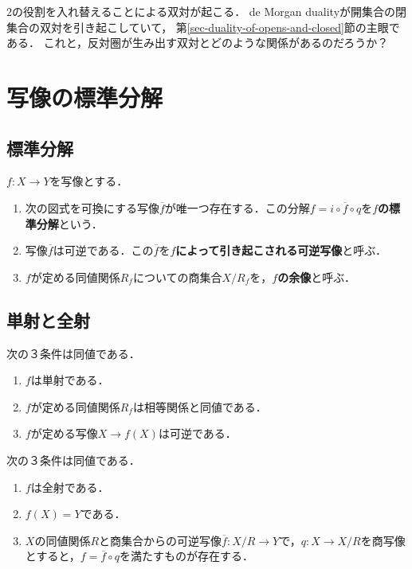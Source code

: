 \documentclass[uplatex,dvipdfmx]{jsreport}
\begin{document}
$2$の役割を入れ替えることによる双対が起こる．
de Morgan dualityが開集合の閉集合の双対を引き起こしていて，
第\ref{sec-duality-of-opens-and-closed}節の主眼である．
これと，反対圏が生み出す双対とどのような関係があるのだろうか？

\section{写像の標準分解}

\subsection{標準分解}

\begin{proposition}
    $f:X\to Y$を写像とする．
    \begin{enumerate}
        \item 次の図式を可換にする写像$\overline{f}$が唯一つ存在する．この分解$f=i\circ\overline{f}\circ q$を\textbf{$f$の標準分解}という．\begin{center}\end{center}
        \item 写像$\overline{f}$は可逆である．この$\overline{f}$を\textbf{$f$によって引き起こされる可逆写像}と呼ぶ．
        \item $f$が定める同値関係$R_f$についての商集合$X/R_f$を，\textbf{$f$の余像}と呼ぶ．
    \end{enumerate}
\end{proposition}

\subsection{単射と全射}

\begin{proposition}[全射と単射の特徴付け]
    次の３条件は同値である．
    \begin{enumerate}
        \item $f$は単射である．
        \item $f$が定める同値関係$R_f$は相等関係と同値である．
        \item $f$が定める写像$X\to f(X)$は可逆である．
    \end{enumerate}
    次の３条件は同値である．
    \begin{enumerate}
        \item $f$は全射である．
        \item $f(X)=Y$である．
        \item $X$の同値関係$R$と商集合からの可逆写像$\overline{f}:X/R\to Y$で，$q:X\to X/R$を商写像とすると，$f=\overline{f}\circ q$を満たすものが存在する．
    \end{enumerate}
\end{proposition}
\end{document}
